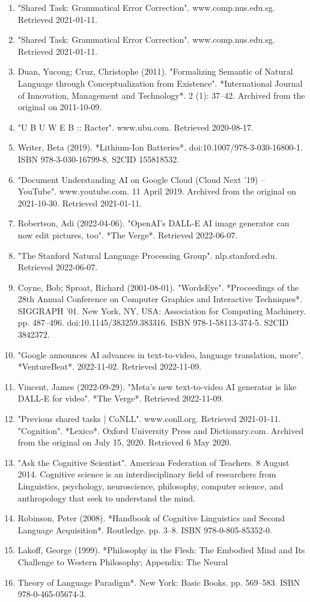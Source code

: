 \begin{enumerate}
\item "Shared Task: Grammatical Error Correction". www.comp.nus.edu.sg. Retrieved 2021-01-11.  
\item "Shared Task: Grammatical Error Correction". www.comp.nus.edu.sg. Retrieved 2021-01-11.  
\item Duan, Yucong; Cruz, Christophe (2011). "Formalizing Semantic of Natural Language through Conceptualization from Existence". *International Journal of Innovation, Management and Technology*. 2 (1): 37–42. Archived from the original on 2011-10-09.  
\item "U B U W E B :: Racter". www.ubu.com. Retrieved 2020-08-17.  
\item Writer, Beta (2019). *Lithium-Ion Batteries*. doi:10.1007/978-3-030-16800-1. ISBN 978-3-030-16799-8. S2CID 155818532.  
\item "Document Understanding AI on Google Cloud (Cloud Next '19) – YouTube". www.youtube.com. 11 April 2019. Archived from the original on 2021-10-30. Retrieved 2021-01-11.  
\item Robertson, Adi (2022-04-06). "OpenAI's DALL-E AI image generator can now edit pictures, too". *The Verge*. Retrieved 2022-06-07.  
\item "The Stanford Natural Language Processing Group". nlp.stanford.edu. Retrieved 2022-06-07.  
\item Coyne, Bob; Sproat, Richard (2001-08-01). "WordsEye". *Proceedings of the 28th Annual Conference on Computer Graphics and Interactive Techniques*. SIGGRAPH '01. New York, NY, USA: Association for Computing Machinery. pp. 487–496. doi:10.1145/383259.383316. ISBN 978-1-58113-374-5. S2CID 3842372.  
\item "Google announces AI advances in text-to-video, language translation, more". *VentureBeat*. 2022-11-02. Retrieved 2022-11-09.  
\item Vincent, James (2022-09-29). "Meta's new text-to-video AI generator is like DALL-E for video". *The Verge*. Retrieved 2022-11-09.  
\item "Previous shared tasks | CoNLL". www.conll.org. Retrieved 2021-01-11.  
"Cognition". *Lexico*. Oxford University Press and Dictionary.com. Archived from the original on July 15, 2020. Retrieved 6 May 2020.  
\item "Ask the Cognitive Scientist". American Federation of Teachers. 8 August 2014. Cognitive science is an interdisciplinary field of researchers from Linguistics, psychology, neuroscience, philosophy, computer science, and anthropology that seek to understand the mind.  
\item Robinson, Peter (2008). *Handbook of Cognitive Linguistics and Second Language Acquisition*. Routledge. pp. 3–8. ISBN 978-0-805-85352-0.  
\item Lakoff, George (1999). *Philosophy in the Flesh: The Embodied Mind and Its Challenge to Western Philosophy; Appendix: The Neural \item Theory of Language Paradigm*. New York: Basic Books. pp. 569–583. ISBN 978-0-465-05674-3.
\end{enumerate}
